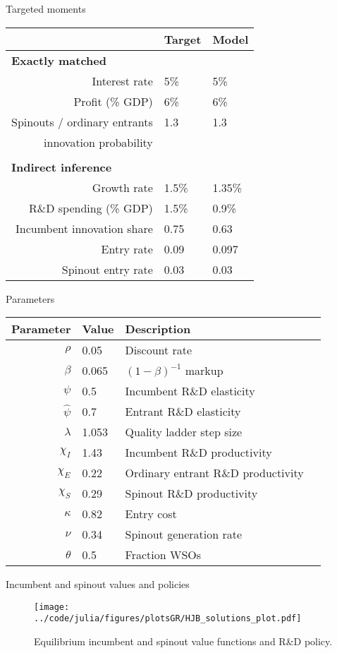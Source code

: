 \documentclass[english,usenames,dvipsnames]{beamer}
\begin{document}
\begin{frame}{Targeted moments}
\begin{table}
	\scriptsize
	\centering
	\begin{tabular}{rll}
		& Target & Model \tabularnewline
		\midrule
		\multicolumn{1}{l}{\textbf{Exactly matched}} & &  \tabularnewline
		Interest rate & 5\% & 5\% \tabularnewline
		Profit (\% GDP) & 6\% & 6\% \tabularnewline
		Spinouts / ordinary entrants & 1.3 & 1.3 \tabularnewline
		innovation probability \tabularnewline
		\tabularnewline
		\multicolumn{1}{l}{\textbf{Indirect inference}} & & 
		\tabularnewline
		Growth rate & 1.5\% & 1.35\% 
		\tabularnewline
		R\&D spending (\% GDP) & 1.5\% & 0.9\% 
		\tabularnewline		
		Incumbent innovation share & 0.75 & 0.63
		\tabularnewline
		Entry rate & 0.09 & 0.097
		\tabularnewline
		Spinout entry rate & 0.03 & 0.03
		\tabularnewline
		\bottomrule
	\end{tabular}
\end{table}

\end{frame}


\begin{frame}{Parameters}
\begin{table}
	\scriptsize
	\centering
	\begin{tabular}{rlll}
		Parameter & Value & Description \tabularnewline
		\midrule
		$\rho$ & 0.05 & Discount rate \tabularnewline
		$\beta$ & 0.065 & $(1-\beta)^{-1}$ markup\tabularnewline
		$\psi$ & 0.5 & Incumbent R\&D elasticity \tabularnewline
		$\hat{\psi}$ & 0.7 & Entrant R\&D elasticity \tabularnewline
		$\lambda$ & 1.053 & Quality ladder step size \tabularnewline
		$\chi_I$ & 1.43 & Incumbent R\&D productivity \tabularnewline
		$\chi_E$ & 0.22 & Ordinary entrant R\&D productivity \tabularnewline
		$\chi_S$ & 0.29 & Spinout R\&D productivity \tabularnewline
		$\kappa$ & 0.82 & Entry cost \tabularnewline
		$\nu$ & 0.34 & Spinout generation rate \tabularnewline
		$\theta$ & 0.5 & Fraction WSOs\tabularnewline
		\bottomrule
	\end{tabular}
\end{table}
\end{frame}


\begin{frame}{Incumbent and spinout values and policies}
\begin{figure}
	\centering
	\texttt{[image: ../code/julia/figures/plotsGR/HJB\_solutions\_plot.pdf]}
	\caption{Equilibrium incumbent and spinout value functions and R\&D policy.}
\end{figure}
\end{frame}
\end{document}
